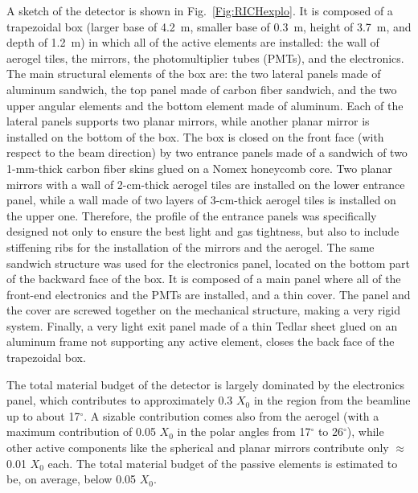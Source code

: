 \documentclass[5p,times,twocolumn]{elsarticle}
\begin{document}
A sketch of the detector is shown in Fig.~\ref{Fig:RICHexplo}. It is composed of a trapezoidal box (larger base of
4.2~m, smaller base of 0.3~m, height of 3.7~m, and depth of 1.2~m) in which all of the active elements are installed:
the wall of aerogel tiles, the mirrors, the photomultiplier tubes (PMTs), and the electronics. The main structural elements of
the box are: the two lateral panels made of aluminum sandwich, the top panel made of carbon fiber sandwich, and the
two upper angular elements and the bottom element made of aluminum. Each of the lateral panels supports two planar
mirrors, while another planar mirror is installed on the bottom of the box. The box is closed on the front face (with
respect to the beam direction) by two entrance panels made of a sandwich of two 1-mm-thick carbon fiber skins glued on a
Nomex honeycomb core. Two planar mirrors with a wall of 2-cm-thick aerogel tiles are installed on the lower entrance panel, while
a wall made of two layers of 3-cm-thick aerogel tiles is installed on the upper one. Therefore, the profile of the entrance panels
was specifically designed not only to ensure the best light and gas tightness, but also to include stiffening ribs for
the installation of the mirrors and the aerogel. The same sandwich structure was used for the electronics panel, located
on the bottom part of the backward face of the box. It is composed of a main panel where all of the front-end electronics
and the PMTs are installed, and a thin cover. The panel and the cover are screwed together on the mechanical
structure, making a very rigid system. Finally, a very light exit panel made of a thin Tedlar sheet glued on an aluminum
frame not supporting any active element, closes the back face of the trapezoidal box. 

The total material budget of the detector is largely dominated by the electronics panel, which contributes to
approximately 0.3 $X_0$ in the region from the beamline up to about 17$^\circ$. A sizable contribution comes also
from the aerogel (with a maximum contribution of 0.05 $X_0$ in the polar angles from 17$^\circ$ to 26$^\circ$),
while other active components like the spherical and planar mirrors contribute only $\approx$0.01 $X_0$ each.
The total material budget of the passive elements is estimated to be, on average, below 0.05 $X_0$.
\end{document}
